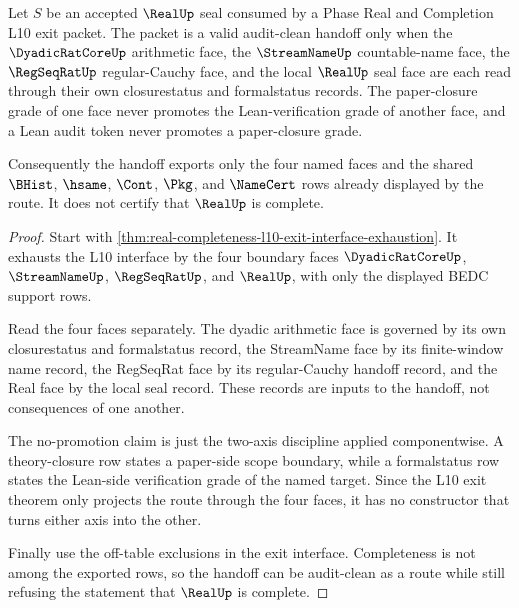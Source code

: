 \begin{theorem}
\label{thm:real-l10-four-face-audit-clean-handoff}
Let $S$ be an accepted $\RealUp$ seal consumed by a Phase Real and Completion L10 exit packet. The packet is a valid audit-clean handoff only when the $\DyadicRatCoreUp$ arithmetic face, the $\StreamNameUp$ countable-name face, the $\RegSeqRatUp$ regular-Cauchy face, and the local $\RealUp$ seal face are each read through their own closurestatus and formalstatus records. The paper-closure grade of one face never promotes the Lean-verification grade of another face, and a Lean audit token never promotes a paper-closure grade.

Consequently the handoff exports only the four named faces and the shared $\BHist$, $\hsame$, $\Cont$, $\Pkg$, and $\NameCert$ rows already displayed by the route. It does not certify that $\RealUp$ is complete.
\end{theorem}
\begin{proof}
Start with \autoref{thm:real-completeness-l10-exit-interface-exhaustion}. It exhausts the L10 interface by the four boundary faces $\DyadicRatCoreUp$, $\StreamNameUp$, $\RegSeqRatUp$, and $\RealUp$, with only the displayed BEDC support rows.

Read the four faces separately. The dyadic arithmetic face is governed by its own closurestatus and formalstatus record, the StreamName face by its finite-window name record, the RegSeqRat face by its regular-Cauchy handoff record, and the Real face by the local seal record. These records are inputs to the handoff, not consequences of one another.

The no-promotion claim is just the two-axis discipline applied componentwise. A theory-closure row states a paper-side scope boundary, while a formalstatus row states the Lean-side verification grade of the named target. Since the L10 exit theorem only projects the route through the four faces, it has no constructor that turns either axis into the other.

Finally use the off-table exclusions in the exit interface. Completeness is not among the exported rows, so the handoff can be audit-clean as a route while still refusing the statement that $\RealUp$ is complete.
\end{proof}

